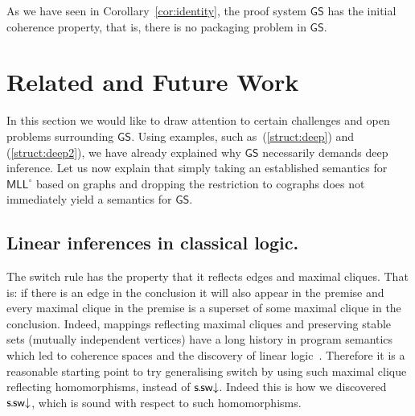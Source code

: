 \documentclass{lmcs} %
\def\GS{\mathsf{GS}}
\def\ssdr{\dssrule}
\def\ssrule{\mathsf{s\mkern-1mu.\mkern-1mu sw}}
\def\dssrule{\ssrule\mathord{\downarrow}}
\def\MLLm{\mathsf{MLL^\circ}}
\theoremstyle{plain}
\begin{document}
As we have seen in Corollary~\ref{cor:identity}, the proof system $\GS$ has the initial coherence property, that is, there is no packaging problem in $\GS$.









\section{Related and Future Work}\label{sec:relatedWork}




In this section we would like to draw attention to certain challenges and open problems surrounding $\GS$.
Using examples, such as~(\ref{struct:deep}) and (\ref{struct:deep2}),
we have already explained why $\GS$ necessarily demands deep inference.
Let us now explain that 
simply taking an established semantics for $\MLLm$ based on graphs and dropping the restriction to cographs does not immediately yield a semantics for $\GS$.



\subsection{Linear inferences in classical logic.}

The switch rule has the property that it reflects edges and maximal cliques.
That is: if there is an edge in the conclusion it will also appear in the premise and every maximal clique in the premise is a superset of some maximal clique in the conclusion.
Indeed, mappings reflecting maximal cliques and preserving stable sets 
(mutually independent vertices) have a long history in
program semantics~\cite{Berry1978} which led to coherence spaces and the discovery of linear logic~\cite{girard:87}.
Therefore it is a reasonable starting point to try generalising switch by using such maximal clique reflecting homomorphisms, instead of $\ssdr$.
Indeed this is how we discovered $\ssdr$, which is sound with respect to such homomorphisms.
\end{document}
